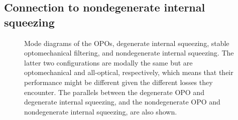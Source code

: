 


\subsection{Connection to nondegenerate internal squeezing}

\begin{figure}
	\centering
	\caption{Mode diagrams of the OPOs, degenerate internal squeezing, stable optomechanical filtering, and nondegenerate internal squeezing. The latter two configurations are modally the same but are optomechanical and all-optical, respectively, which means that their performance might be different given the different losses they encounter. The parallels between the degenerate OPO and degenerate internal squeezing, and the nondegenerate OPO and nondegenerate internal squeezing, are also shown.}
	\label{fig:mode_diagram}
\end{figure}

